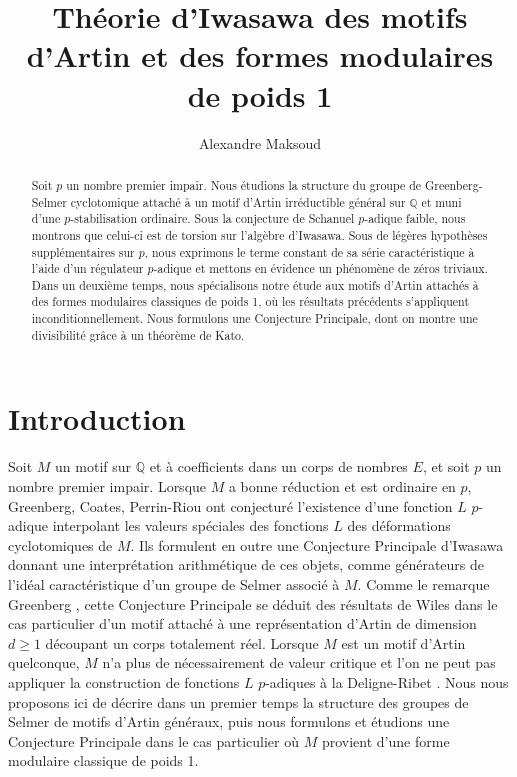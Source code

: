 \documentclass[12pt]{amsart}
\author{Alexandre Maksoud}
\title{Théorie d'Iwasawa des motifs d'Artin et des formes modulaires de poids 1}
\newcommand\bQ{\mathbb{Q}}
\theoremstyle{defstyle}
\theoremstyle{thmstyle}
\begin{document}
	\maketitle
	
	\begin{abstract}
		Soit $p$ un nombre premier impair. Nous étudions la structure du groupe de Greenberg-Selmer cyclotomique attaché à un motif d'Artin irréductible général sur $\mathbb{Q}$ et muni d'une $p$-stabilisation ordinaire. Sous la conjecture de Schanuel $p$-adique faible, nous montrons que celui-ci est de torsion sur l'algèbre d'Iwasawa. Sous de légères hypothèses supplémentaires sur $p$, nous exprimons le terme constant de sa série caractéristique à l'aide d'un régulateur $p$-adique et mettons en évidence un phénomène de zéros triviaux. Dans un deuxième temps, nous spécialisons notre étude aux motifs d'Artin attachés à des formes modulaires classiques de poids 1, où les résultats précédents s'appliquent inconditionnellement. Nous formulons une Conjecture Principale, dont on montre une divisibilité grâce à un théorème de Kato.
	\end{abstract}
	\section*{Introduction}
Soit $M$ un motif sur $\bQ$ et à coefficients dans un corps de nombres $E$, et soit $p$ un nombre premier impair. Lorsque $M$ a bonne réduction et est ordinaire en $p$, Greenberg, Coates, Perrin-Riou \cite{greenbergdeformation,coatesmotivic,prasterisque} ont conjecturé l'existence d'une fonction $L$ $p$-adique interpolant les valeurs spéciales des fonctions $L$ des déformations cyclotomiques de $M$. Ils formulent en outre une Conjecture Principale d'Iwasawa donnant une interprétation arithmétique de ces objets, comme générateurs de l'idéal caractéristique d'un groupe de Selmer associé à $M$. 
Comme le remarque Greenberg \cite{greenbergartinII}, cette Conjecture Principale se déduit des résultats de Wiles \cite{wiles1990iwasawa} dans le cas particulier d'un motif attaché à une représentation d'Artin de dimension $d\geq 1$ découpant un corps totalement réel. Lorsque $M$ est un motif d'Artin quelconque, $M$ n'a plus de nécessairement de valeur critique et l'on ne peut pas appliquer la construction de fonctions $L$ $p$-adiques à la Deligne-Ribet \cite{deligneribet}.
Nous nous proposons ici de décrire dans un premier temps la structure des groupes de Selmer de motifs d'Artin généraux, puis nous formulons et étudions une Conjecture Principale dans le cas particulier où $M$ provient d'une forme modulaire classique de poids 1. 
\end{document}
